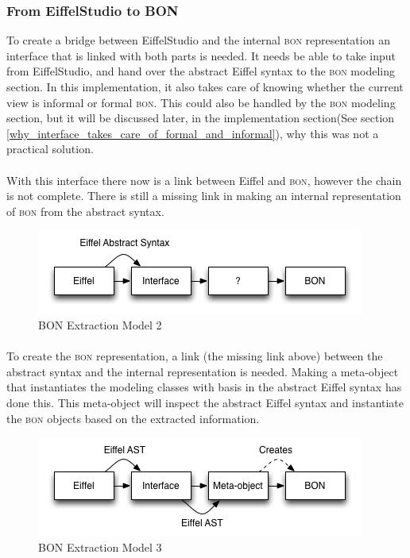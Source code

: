 \subsubsection{From EiffelStudio to BON}
To create a bridge between EiffelStudio and the internal \textsc{bon} representation an interface that is linked with both parts is needed. It needs be able to take input from EiffelStudio, and hand over the abstract Eiffel syntax to the \textsc{bon} modeling section. In this implementation, it also takes care of knowing whether the current view is informal or formal \textsc{bon}. This could also be handled by the \textsc{bon} modeling section, but it will be discussed later, in the implementation section(See section \ref{why_interface_takes_care_of_formal_and_informal}), why this was not a practical solution.

\paragraph{}
With this interface there now is a link between Eiffel and \textsc{bon}, however the chain is not complete. There is still a missing link in making an internal representation of \textsc{bon} from the abstract syntax.
\begin{figure}[H]
\centering
\includegraphics[scale=0.8]{images/BON-extraction-model-2.png}
\caption{BON Extraction Model 2}
\label{fig:bon_extraction_2}
\end{figure}

\paragraph{}
To create the \textsc{bon} representation, a link (the missing link above) between the abstract syntax and the internal representation is needed. Making a meta-object that instantiates the modeling classes with basis in the abstract Eiffel syntax has done this. This meta-object will inspect the abstract Eiffel syntax and instantiate the \textsc{bon} objects based on the extracted information.
\begin{figure}[H]
\centering
\includegraphics[scale=0.8]{images/BON-extraction-model-3.png}
\caption{BON Extraction Model 3}
\label{fig:bon_extraction_3}
\end{figure}

